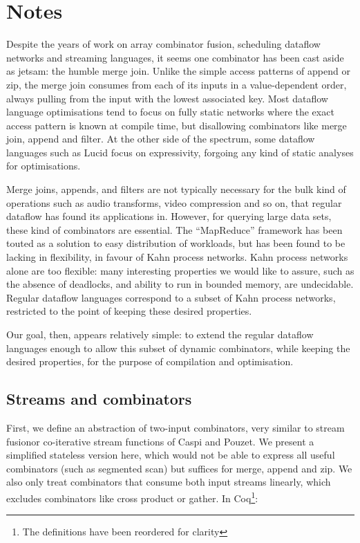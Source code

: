 \section{Notes}
\label{s:Notes}

Despite the years of work on array combinator fusion, scheduling dataflow networks and streaming languages, it seems one combinator has been cast aside as jetsam: the humble merge join.
Unlike the simple access patterns of append or zip, the merge join consumes from each of its inputs in a value-dependent order, always pulling from the input with the lowest associated key.
Most dataflow language optimisations tend to focus on fully static networks where the exact access pattern is known at compile time\cite{thies2002streamit}, but disallowing combinators like merge join, append and filter.
At the other side of the spectrum, some dataflow languages such as Lucid\cite{stephens1997survey} focus on expressivity, forgoing any kind of static analyses for optimisations.

Merge joins, appends, and filters are not typically necessary for the bulk kind of operations such as audio transforms, video compression and so on, that regular dataflow has found its applications in\cite{johnston2004advances}.
However, for querying large data sets, these kind of combinators are essential.
The ``MapReduce'' framework has been touted as a solution to easy distribution of workloads, but has been found to be lacking in flexibility\cite{vrba2009kahn}, in favour of Kahn process networks.
Kahn process networks alone are too flexible: many interesting properties we would like to assure, such as the absence of deadlocks, and ability to run in bounded memory, are undecidable.
Regular dataflow languages correspond to a subset of Kahn process networks, restricted to the point of keeping these desired properties\cite{thies2009language}.

Our goal, then, appears relatively simple: to extend the regular dataflow languages enough to allow this subset of dynamic combinators, while keeping the desired properties, for the purpose of compilation and optimisation.

\subsection{Streams and combinators}
First, we define an abstraction of two-input combinators, very similar to stream fusion\CITE or co-iterative stream functions of Caspi and Pouzet\cite{caspi1998co}.
We present a simplified stateless version here, which would not be able to express all useful combinators (such as segmented scan) but suffices for merge, append and zip.
We also only treat combinators that consume both input streams linearly, which excludes combinators like cross product or gather.
In Coq\footnote{The definitions have been reordered for clarity}:

